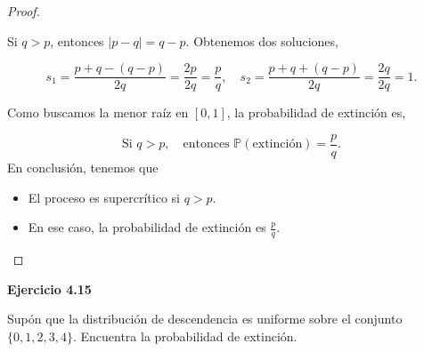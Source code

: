 \documentclass{article}
\begin{document}
\begin{proof}
\begin{itemize}
Si \( q > p \), entonces \( |p - q| = q - p \). Obtenemos dos soluciones,

\[
s_1 = \frac{p + q - (q - p)}{2q} = \frac{2p}{2q} = \frac{p}{q}, \quad
s_2 = \frac{p + q + (q - p)}{2q} = \frac{2q}{2q} = 1.
\]

Como buscamos la menor raíz en \( [0,1] \), la probabilidad de extinción es,

\[
    \text{Si } q > p, \quad \text{entonces } \mathbb{P}(\text{extinción}) = \frac{p}{q}.
\]
En conclusión, tenemos que
\begin{itemize}
\item El proceso es supercrítico si \( q > p \).
\item En ese caso, la probabilidad de extinción es \(\frac{p}{q} \).
\end{itemize}
\end{itemize}
\end{proof}

\textbf{Ejercicio 4.15}

Supón que la distribución de descendencia es uniforme sobre el conjunto \( \{0, 1, 2, 3, 4\} \). Encuentra la probabilidad de extinción.
\end{document}
